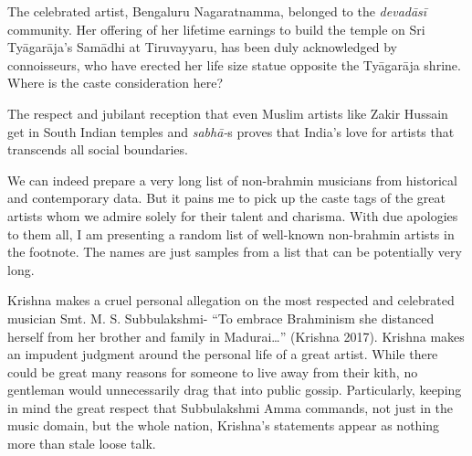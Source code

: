 The celebrated artist, Bengaluru Nagaratnamma, belonged to the \textit{devadāsī} community. Her offering of her lifetime earnings to build the temple on Sri Tyāgarāja’s Samādhi at Tiruvayyaru, has been duly acknowledged by connoisseurs, who have erected her life size statue opposite the Tyāgarāja shrine. Where is the caste consideration here?

The respect and jubilant reception that even Muslim artists like Zakir Hussain get in South Indian temples and \textit{sabhā-}s proves that India’s love for artists that transcends all social boundaries.

We can indeed prepare a very long list of non-brahmin musicians from historical and contemporary data. But it pains me to pick up the caste tags of the great artists whom we admire solely for their talent and charisma. With due apologies to them all, I am presenting a random list of well-known non-brahmin artists in the footnote. The names are just samples from a list that can be potentially very long.

Krishna makes a cruel personal allegation on the most respected and celebrated musician Smt. M. S. Subbulakshmi- “To embrace Brahminism she distanced herself from her brother and family in Madurai…” (Krishna 2017). Krishna makes an impudent judgment around the personal life of a great artist. While there could be great many reasons for someone to live away from their kith, no gentleman would unnecessarily drag that into public gossip. Particularly, keeping in mind the great respect that Subbulakshmi Amma commands, not just in the music domain, but the whole nation, Krishna’s statements appear as nothing more than stale loose talk.

